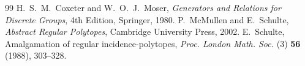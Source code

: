\documentclass[10pt,a4paper]{amsart}
\theoremstyle{definition}
\begin{document}
\begin{thebibliography}{99}
 H.~S.~M.~Coxeter and W.~O.~J.~Moser, \textit{Generators and Relations for Discrete Groups}, 4th Edition, Springer, 1980.
 P.~McMullen and E.~Schulte, \textit{Abstract Regular Polytopes}, Cambridge University Press, 2002.
 E.~Schulte, Amalgamation of regular incidence-polytopes, \textit{Proc. London Math. Soc.\/} (3) {\bf 56} (1988), 303--328.
\end{thebibliography}
\end{document}
